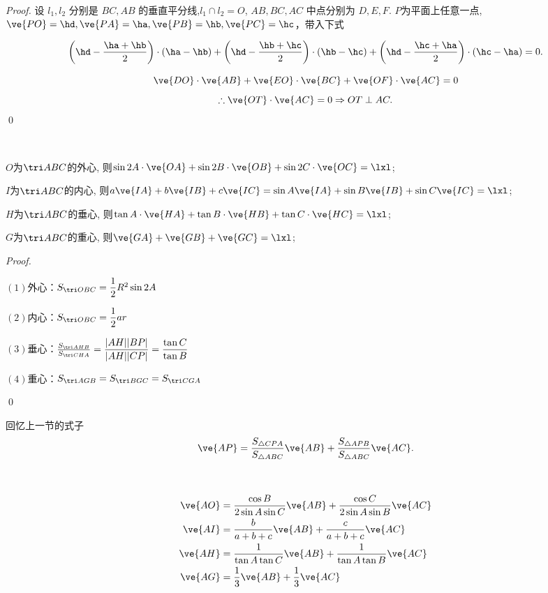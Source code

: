 \begin{proof}
    设 $l_1, l_2$ 分别是 $BC, AB$ 的垂直平分线,\(l_1\cap l_2=O\), $AB, BC, AC$ 中点分别为 $D, E, F$.
    \(P\)为平面上任意一点,\(\ve{PO}=\hd, \ve{PA}=\ha,\ve{PB}=\hb,\ve{PC}=\hc\)，带入下式

    \[
\left(\hd - \frac{\ha+\hb}{2}\right) \cdot (\ha-\hb) + \left(\hd-\frac{\hb+\hc}{2}\right) \cdot (\hb-\hc) + \left(
    \hd - \frac{\hc+\ha}{2}\right) \cdot (\hc-\ha) = 0.
\]

\[
\ve{DO} \cdot \ve{AB} + \ve{EO} \cdot \ve{BC} + \ve{OF} \cdot \ve{AC} = 0
\]
\[
\therefore \ve{OT} \cdot \ve{AC} = 0 \Rightarrow  OT \perp AC.
\]
\qed
\end{proof}

\begin{corollary}
    \ 

    \(O\)为\(\tri ABC\)的外心, 则\(\sin 2A \cdot\ve{OA}+\sin 2B\cdot\ve{OB}+\sin 2C\cdot\ve{OC}=\lxl\);

    \(I\)为\(\tri ABC\)的内心, 则\(a\ve{IA}+b\ve{IB}+c\ve{IC}=\sin A\ve{IA}+\sin B\ve{IB}+\sin C\ve{IC}=\lxl\);

    \(H\)为\(\tri ABC\)的垂心, 则\(\tan A \cdot\ve{HA}+\tan B\cdot\ve{HB}+\tan C\cdot\ve{HC}=\lxl\);

    \(G\)为\(\tri ABC\)的重心, 则\(\ve{GA}+\ve{GB}+\ve{GC}=\lxl\);
\end{corollary}
\begin{proof}
    \  

    \((1)\)外心：\(S_{\tri OBC}=\dfrac{1}{2}R^2\sin 2A\)

    \((2)\)内心：\(S_{\tri OBC}=\dfrac{1}{2}ar\)

    \((3)\)垂心：\(\frac{S_{\tri AHB}}{S_{\tri CHA}}=\dfrac{|AH||BP|}{|AH||CP|}=\dfrac{\tan C}{\tan B}\)

    \((4)\)重心：\(S_{\tri AGB}=S_{\tri BGC}=S_{\tri CGA}\)
    
    \qed
\end{proof}
回忆上一节的式子
\[
\ve{AP} =\frac{S_{\triangle CPA}}{S_{\triangle ABC}} \ve{AB} + \frac{S_{\triangle APB}}{S_{\triangle ABC}} \ve{AC}.
\]
\begin{proposition}
    \ 

    \begin{align*}
        \ve{AO}&=\frac{\cos B}{2\sin A\sin C}\ve{AB}+\frac{\cos C}{2\sin A\sin B}\ve{AC}\\
    \ve{AI}&=\frac{b}{a+b+c}\ve{AB}+\frac{c}{a+b+c}\ve{AC}\\
    \ve{AH}&=\frac{1}{\tan A \tan C}\ve{AB}+\frac{1}{\tan A\tan B}\ve{AC}\\
    \ve{AG}&=\dfrac{1}{3}\ve{AB}+\dfrac{1}{3}\ve{AC}
    \end{align*}
    
\end{proposition}
